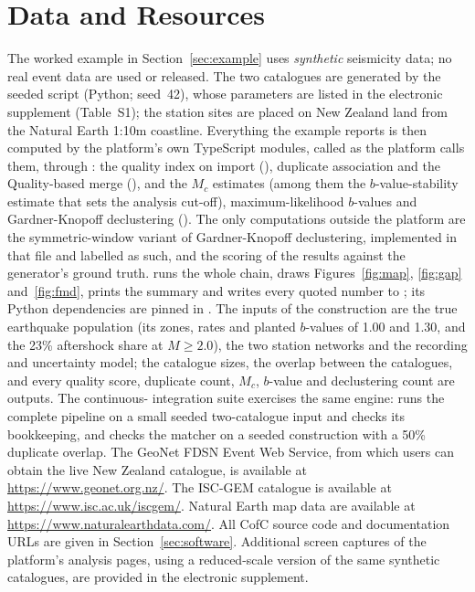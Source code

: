 \documentclass[12pt]{article}
\begin{document}
\section*{Data and Resources}

The worked example in Section~\ref{sec:example} uses \emph{synthetic} seismicity
data; no real event data are used or released.  The two catalogues are generated
by the seeded script  (Python;
seed~42), whose parameters are listed in the electronic supplement (Table~S1);
the station sites are placed on New Zealand land from the Natural Earth 1:10m
coastline.  Everything the example reports is then computed by the platform's
own TypeScript modules, called as the platform calls them, through
: the quality index on import
(), duplicate association and the Quality-based
merge (), and the $M_c$ estimates (among them the
$b$-value-stability estimate that sets the analysis cut-off), maximum-likelihood
$b$-values and Gardner-Knopoff declustering
().  The only computations outside the
platform are the symmetric-window variant of Gardner-Knopoff declustering,
implemented in that file and labelled as such, and the scoring of the results
against the generator's ground truth.   runs the
whole chain, draws Figures~\ref{fig:map}, \ref{fig:gap} and~\ref{fig:fmd}, prints
the summary and writes every quoted number to
; its Python dependencies are
pinned in .  The inputs of the
construction are the true earthquake population (its zones, rates and planted
$b$-values of 1.00 and 1.30, and the 23\% aftershock share at $M \geq 2.0$), the
two station networks and the recording and uncertainty model; the catalogue
sizes, the overlap between the catalogues, and every quality score, duplicate
count, $M_c$, $b$-value and declustering count are outputs.  The continuous-
integration suite exercises the same engine:
 runs the complete pipeline on
a small seeded two-catalogue input and checks its bookkeeping, and
 checks the matcher on a
seeded construction with a 50\% duplicate overlap.  The GeoNet FDSN Event Web
Service, from which users can obtain the live New Zealand catalogue, is available
at \url{https://www.geonet.org.nz/}.  The ISC-GEM catalogue \citep{storchak2013}
is available at \url{https://www.isc.ac.uk/iscgem/}.  Natural Earth map data are
available at \url{https://www.naturalearthdata.com/}.  All CofC source code and
documentation URLs are given in Section~\ref{sec:software}.  Additional screen
captures of the platform's analysis pages, using a reduced-scale version of the
same synthetic catalogues, are provided in the electronic supplement.
\end{document}
